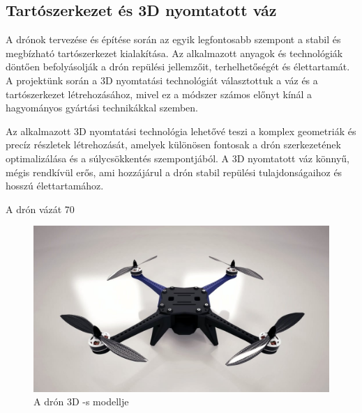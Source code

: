 \subsection{Tartószerkezet és 3D nyomtatott váz}

A drónok tervezése és építése során az egyik legfontosabb szempont a stabil és megbízható tartószerkezet kialakítása. Az alkalmazott anyagok és technológiák döntően befolyásolják a drón repülési jellemzőit, terhelhetőségét és élettartamát. A projektünk során a 3D nyomtatási technológiát választottuk a váz és a tartószerkezet létrehozásához, mivel ez a módszer számos előnyt kínál a hagyományos gyártási technikákkal szemben.

Az alkalmazott 3D nyomtatási technológia lehetővé teszi a komplex geometriák és precíz részletek létrehozását, amelyek különösen fontosak a drón szerkezetének optimalizálása és a súlycsökkentés szempontjából. A 3D nyomtatott váz könnyű, mégis rendkívül erős, ami hozzájárul a drón stabil repülési tulajdonságaihoz és hosszú élettartamához.

A drón vázát 70%

\begin{figure}[H]
	\centering
	\includegraphics[scale=0.3]{figures/drone_model.JPG}
	\caption{A drón 3D -s modellje}
	\label{A drón 3D -s modellje}
\end{figure}

